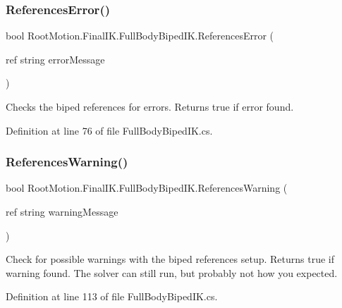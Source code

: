 \subsubsection{\texorpdfstring{References\+Error()}{ReferencesError()}}
{\footnotesize\ttfamily bool Root\+Motion.\+Final\+I\+K.\+Full\+Body\+Biped\+I\+K.\+References\+Error (\begin{DoxyParamCaption}\item[{ref string}]{error\+Message }\end{DoxyParamCaption})}



Checks the biped references for errors. Returns true if error found. 



Definition at line 76 of file Full\+Body\+Biped\+I\+K.\+cs.

\mbox{\label{class_root_motion_1_1_final_i_k_1_1_full_body_biped_i_k_a0668d64f894aa8f21ae2057c06788812}} 
\subsubsection{\texorpdfstring{References\+Warning()}{ReferencesWarning()}}
{\footnotesize\ttfamily bool Root\+Motion.\+Final\+I\+K.\+Full\+Body\+Biped\+I\+K.\+References\+Warning (\begin{DoxyParamCaption}\item[{ref string}]{warning\+Message }\end{DoxyParamCaption})}



Check for possible warnings with the biped references setup. Returns true if warning found. The solver can still run, but probably not how you expected. 



Definition at line 113 of file Full\+Body\+Biped\+I\+K.\+cs.

\mbox{\label{class_root_motion_1_1_final_i_k_1_1_full_body_biped_i_k_a824614a4b5c443a03dfff3a5edea0485}} 
